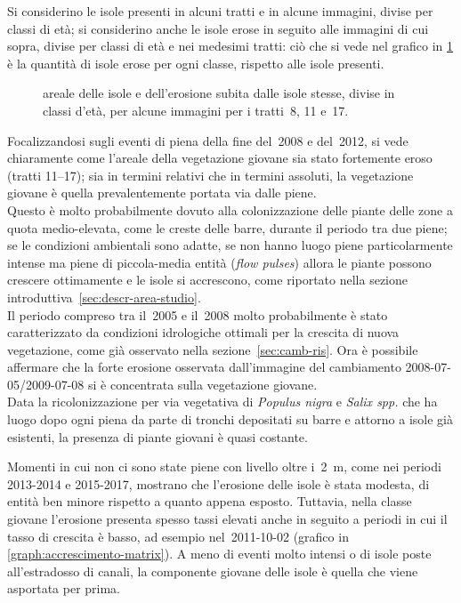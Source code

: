 Si considerino le isole presenti in alcuni tratti e in alcune immagini, divise per classi di età; si considerino anche le isole erose in seguito alle immagini di cui sopra, divise per classi di età e nei medesimi tratti: ciò che si vede nel grafico in \cref{graph:distr-eta} è la quantità di isole erose per ogni classe, rispetto alle isole presenti. 
%
\begin{figure}
	\centering
	
	\caption[areale delle isole e dell'erosione subita divise in classi d'età per i tratti~8, 11 e~17]{areale delle isole e dell'erosione subita dalle isole stesse, divise in classi d'età, per alcune immagini per i tratti~8, 11 e~17.}
	\label{graph:distr-eta}
\end{figure}
%
Focalizzandosi sugli eventi di piena della fine del~2008 e del~2012, si vede chiaramente come l'areale della vegetazione giovane sia stato fortemente eroso (tratti \numrange[range-phrase={ e }]{11}{17});
sia in termini relativi che in termini assoluti, la vegetazione giovane è quella prevalentemente portata via dalle piene.
\\
Questo è molto probabilmente dovuto alla colonizzazione delle piante delle zone a quota medio-elevata, come le creste delle barre, durante il periodo tra due piene; 
se le condizioni ambientali sono adatte, se non hanno luogo piene particolarmente intense ma piene di piccola-media entità (\emph{flow pulses}) allora le piante possono crescere ottimamente e le isole si accrescono, come riportato nella sezione introduttiva~\ref{sec:descr-area-studio}.
\\
Il periodo compreso tra il~2005 e il~2008 molto probabilmente è stato caratterizzato da condizioni idrologiche ottimali per la crescita di nuova vegetazione, come già osservato nella sezione~\ref{sec:camb-ris}.
Ora è possibile affermare che la forte erosione osservata dall'immagine del cambiamento 2008-07-05/2009-07-08 si è concentrata sulla vegetazione giovane.
\\
Data la ricolonizzazione per via vegetativa di \emph{Populus nigra} e \emph{Salix spp.} che ha luogo dopo ogni piena da parte di tronchi depositati su barre e attorno a isole già esistenti, la presenza di piante giovani è quasi costante.

Momenti in cui non ci sono state piene con livello oltre i~\SI{2}{\m}, come nei periodi 2013-2014 e 2015-2017, mostrano che l'erosione delle isole è stata modesta, di entità ben minore rispetto a quanto appena esposto. Tuttavia, nella classe giovane l'erosione presenta spesso tassi elevati anche in seguito a periodi in cui il tasso di crescita è basso, ad esempio nel~2011-10-02 (grafico in \cref{graph:accrescimento-matrix}).
A meno di eventi molto intensi o di isole poste all'estradosso di canali, la componente giovane delle isole è quella che viene asportata per prima.

